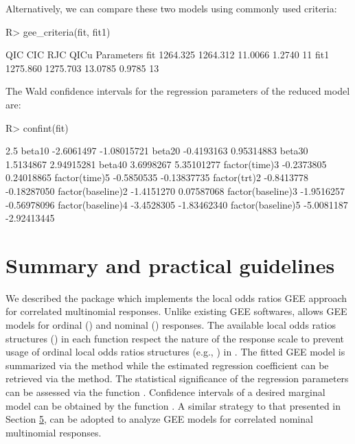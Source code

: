\documentclass[
]{jss}
\begin{document}
Alternatively, we can compare these two models using commonly used
criteria:

\begin{CodeChunk}
\begin{CodeInput}
R> gee_criteria(fit, fit1)
\end{CodeInput}
\begin{CodeOutput}
          QIC      CIC     RJC   QICu Parameters
fit  1264.325 1264.312 11.0066 1.2740         11
fit1 1275.860 1275.703 13.0785 0.9785         13
\end{CodeOutput}
\end{CodeChunk}

The Wald confidence intervals for the regression parameters of the
reduced model are:

\begin{CodeChunk}
\begin{CodeInput}
R> confint(fit)
\end{CodeInput}
\begin{CodeOutput}
                       2.5 %
beta10            -2.6061497 -1.08015721
beta20            -0.4193163  0.95314883
beta30             1.5134867  2.94915281
beta40             3.6998267  5.35101277
factor(time)3     -0.2373805  0.24018865
factor(time)5     -0.5850535 -0.13837735
factor(trt)2      -0.8413778 -0.18287050
factor(baseline)2 -1.4151270  0.07587068
factor(baseline)3 -1.9516257 -0.56978096
factor(baseline)4 -3.4528305 -1.83462340
factor(baseline)5 -5.0081187 -2.92413445
\end{CodeOutput}
\end{CodeChunk}

\hypertarget{Summary}{%
\section{Summary and practical guidelines}\label{Summary}}

We described the  package  which implements the
local odds ratios GEE approach \citep{Touloumis2012} for correlated
multinomial responses. Unlike existing GEE softwares, 
allows GEE models for ordinal () and nominal
() responses. The available local odds ratios structures
() in each function respect the nature of the response
scale to prevent usage of ordinal local odds ratios structures (e.g.,
) in . The fitted GEE model is
summarized via the  method while the estimated regression
coefficient can be retrieved via the  method. The statistical
significance of the regression parameters can be assessed via the
function . Confidence intervals of a desired marginal model
can be obtained by the function . A similar strategy to
that presented in Section \protect\hyperlink{Example}{5}, can be adopted
to analyze GEE models for correlated nominal multinomial responses.
\end{document}
